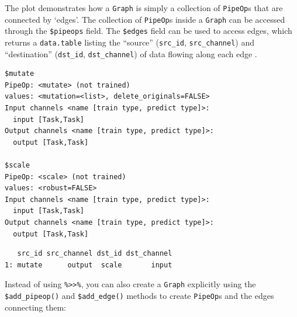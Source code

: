 The plot demonstrates how a \texttt{Graph} is simply a collection of
\texttt{PipeOp}s that are connected by `edges'. The collection of
\texttt{PipeOp}s inside a \texttt{Graph} can be accessed through the
\texttt{\$pipeops}  field. The \texttt{\$edges}
 field can be used to access edges, which returns a
\texttt{data.table} listing the ``source'' (\texttt{src\_id},
\texttt{src\_channel}) and ``destination'' (\texttt{dst\_id},
\texttt{dst\_channel}) of data flowing along each edge
{}.

\begin{Shaded}
\begin{Highlighting}[]
\SpecialCharTok{$}
\end{Highlighting}
\end{Shaded}

\begin{verbatim}
$mutate
PipeOp: <mutate> (not trained)
values: <mutation=<list>, delete_originals=FALSE>
Input channels <name [train type, predict type]>:
  input [Task,Task]
Output channels <name [train type, predict type]>:
  output [Task,Task]

$scale
PipeOp: <scale> (not trained)
values: <robust=FALSE>
Input channels <name [train type, predict type]>:
  input [Task,Task]
Output channels <name [train type, predict type]>:
  output [Task,Task]
\end{verbatim}

\begin{Shaded}
\begin{Highlighting}[]
\SpecialCharTok{$}
\end{Highlighting}
\end{Shaded}

\begin{verbatim}
   src_id src_channel dst_id dst_channel
1: mutate      output  scale       input
\end{verbatim}

Instead of using \texttt{\%\textgreater{}\textgreater{}\%}, you can also
create a \texttt{Graph} explicitly using the \texttt{\$add\_pipeop()}
and \texttt{\$add\_edge()} methods to create \texttt{PipeOp}s and the
edges connecting them:

\begin{Shaded}
\begin{Highlighting}[]
\OtherTok{=}\SpecialCharTok{$}\NormalTok{()}\SpecialCharTok{$}
  \SpecialCharTok{$}
  \SpecialCharTok{$}
  \NormalTok{(}\NormalTok{, }\NormalTok{)}
\end{Highlighting}
\end{Shaded}

